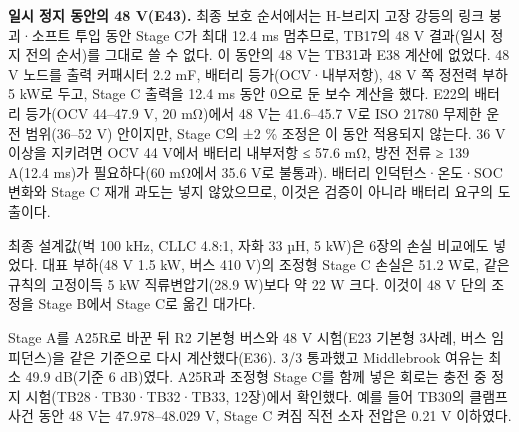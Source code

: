 \textbf{일시 정지 동안의 48 V(E43).} 최종 보호 순서에서는 H-브리지 고장 강등의 링크 붕괴·소프트 투입 동안 Stage C가 최대 12.4 ms 멈추므로, TB17의 48 V 결과(일시 정지 전의 순서)를 그대로 쓸 수 없다. 이 동안의 48 V는 TB31과 E38 계산에 없었다. 48 V 노드를 출력 커패시터 2.2 mF, 배터리 등가(OCV·내부저항), 48 V 쪽 정전력 부하 5 kW로 두고, Stage C 출력을 12.4 ms 동안 0으로 둔 보수 계산을 했다. E22의 배터리 등가(OCV 44–47.9 V, 20 mΩ)에서 48 V는 41.6–45.7 V로 ISO 21780 무제한 운전 범위(36–52 V) 안이지만, Stage C의 ±2 \% 조정은 이 동안 적용되지 않는다. 36 V 이상을 지키려면 OCV 44 V에서 배터리 내부저항 ≤ 57.6 mΩ, 방전 전류 ≥ 139 A(12.4 ms)가 필요하다(60 mΩ에서 35.6 V로 불통과). 배터리 인덕턴스·온도·SOC 변화와 Stage C 재개 과도는 넣지 않았으므로, 이것은 검증이 아니라 배터리 요구의 도출이다.

최종 설계값(벅 100 kHz, CLLC 4.8:1, 자화 33 µH, 5 kW)은 6장의 손실 비교에도 넣었다. 대표 부하(48 V 1.5 kW, 버스 410 V)의 조정형 Stage C 손실은 51.2 W로, 같은 규칙의 고정이득 5 kW 직류변압기(28.9 W)보다 약 22 W 크다. 이것이 48 V 단의 조정을 Stage B에서 Stage C로 옮긴 대가다.

Stage A를 A25R로 바꾼 뒤 R2 기본형 버스와 48 V 시험(E23 기본형 3사례, 버스 임피던스)을 같은 기준으로 다시 계산했다(E36). 3/3 통과했고 Middlebrook 여유는 최소 49.9 dB(기준 6 dB)였다. A25R과 조정형 Stage C를 함께 넣은 회로는 충전 중 정지 시험(TB28·TB30·TB32·TB33, 12장)에서 확인했다. 예를 들어 TB30의 클램프 사건 동안 48 V는 47.978–48.029 V, Stage C 켜짐 직전 소자 전압은 0.21 V 이하였다.
